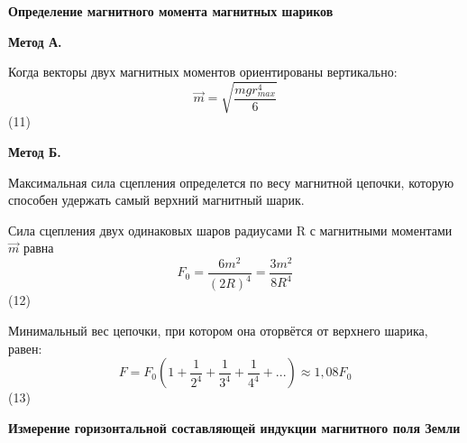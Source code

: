 \documentclass[a4paper,12pt]{article}
\begin{document}
\noindent\textbf{Определение магнитного момента магнитных шариков}

\textbf{Метод А.} 

Когда векторы двух магнитных моментов ориентированы вертикально: $$ \vec{m} = \sqrt{\frac{mg{r_{max}^4}}{6}} $$ (11) 


\textbf{Метод Б.}

Максимальная сила сцепления определется по весу магнитной цепочки, которую способен удержать самый верхний магнитный шарик.


Сила сцепления двух одинаковых шаров радиусами R с магнитными моментами $\vec{m}$ равна $$ F_0 = \frac{6m^2}{{(2R)}^4} = \frac{3m^2}{8R^4} $$ (12)

Минимальный вес цепочки, при котором она оторвётся от верхнего шарика, равен: $$ F = F_0(1 + \frac{1}{2^4} + \frac{1}{3^4} + \frac{1}{4^4} + ...) \approx 1,08F_0 $$ (13)

\textbf{Измерение горизонтальной составляющей индукции магнитного поля Земли}
\end{document}
